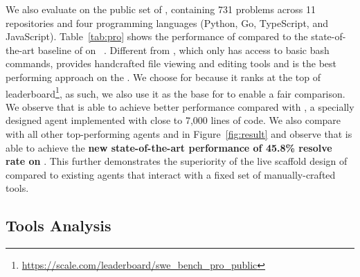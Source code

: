 \begin{table}[t!]
\centering
\caption{Result on \swebenchpro{}}
\label{tab:pro}
\end{table}

We also evaluate \tech on the public set of \swebenchpro, containing 731 problems across 11 repositories and four programming languages (Python, Go, TypeScript, and JavaScript).
Table~\ref{tab:pro} shows the performance of \tech compared to the state-of-the-art baseline of \sweagent on \swebenchpro~\cite{deng2025swe}.
Different from \minisweagent, which only has access to basic bash commands, \sweagent provides handcrafted file viewing and editing tools and is the best performing approach on the \swebenchpro.
We choose \claudesonnetfourfive{} for \sweagent because it ranks at the top of \swebenchpro leaderboard\footnote{\url{https://scale.com/leaderboard/swe_bench_pro_public}}, as such, we also use it as the base \llm for \tech to enable a fair comparison.
We observe that \tech is able to achieve better performance compared with \sweagent, a specially designed agent implemented with close to 7,000 lines of code.
We also compare with all other top-performing agents and  in Figure~\ref{fig:result} and observe that \tech is able to achieve the \textbf{new state-of-the-art performance of 45.8\% resolve rate on \swebenchpro}.
This further demonstrates the superiority of the live scaffold design of \tech compared to existing agents that interact with a fixed set of manually-crafted tools.

\subsection{Tools Analysis}
\label{sec:tool_analysis}

